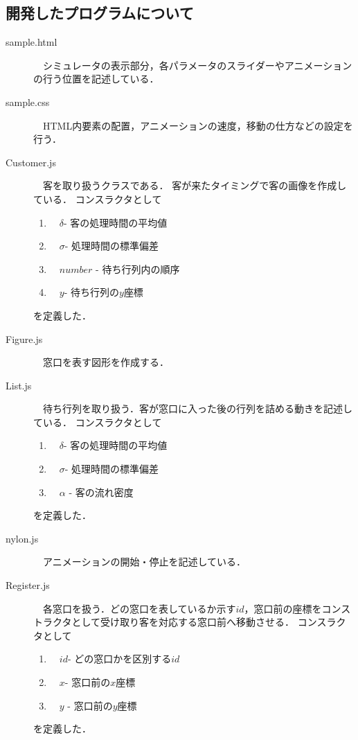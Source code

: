 \documentclass[12pt,a4j]{ltjsarticle}
\begin{document}
\subsection{開発したプログラムについて}
\begin{description}
  \item[sample.html]　シミュレータの表示部分，各パラメータのスライダーやアニメーションの行う位置を記述している．
  \vspace{10mm}
  
  \item[sample.css]　HTML内要素の配置，アニメーションの速度，移動の仕方などの設定を行う．
  \vspace{10mm}
  
  \item[Customer.js]　客を取り扱うクラスである．
  客が来たタイミングで客の画像を作成している．
  コンスラクタとして
  \begin{enumerate}[label=(\arabic*)]
	\item　$\delta$- 客の処理時間の平均値
	\item　$\sigma$- 処理時間の標準偏差
	\item　$number$  - 待ち行列内の順序
	\item　$y$- 待ち行列の$y$座標
\end{enumerate}
を定義した．
\vspace{10mm}

  \item[Figure.js] 　窓口を表す図形を作成する．
  \vspace{10mm}
  
  \item[List.js]　待ち行列を取り扱う．客が窓口に入った後の行列を詰める動きを記述している． コンスラクタとして
  \begin{enumerate}[label=(\roman*)]
	\item　$\delta$- 客の処理時間の平均値
	\item　$\sigma$- 処理時間の標準偏差
	\item　$\alpha$ - 客の流れ密度
\end{enumerate}
を定義した．
\vspace{10mm}

  \item[nylon.js]　アニメーションの開始・停止を記述している．
  \vspace{10mm}
  
  \item[Register.js]　各窓口を扱う．どの窓口を表しているか示す$id$，窓口前の座標をコンストラクタとして受け取り客を対応する窓口前へ移動させる．
 コンスラクタとして
  \begin{enumerate}[label=(\Roman*)]
	\item　$id$- どの窓口かを区別する$id$
	\item　$x$- 窓口前の$x$座標
	\item　$y$ - 窓口前の$y$座標
\end{enumerate}
を定義した．
\vspace{10mm}
\clearpage


\end{description}
\end{document}
